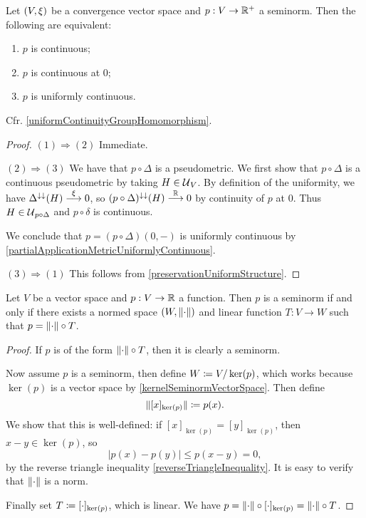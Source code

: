 \begin{proposition} \label{uniformContinuitySeminorms}
Let $\sSet{V,\xi}$ be a convergence vector space and $p: V\to \mathbb{R}^+$ a seminorm. Then the following are equivalent:
\begin{enumerate}
\item $p$ is continuous;
\item $p$ is continuous at $0$;
\item $p$ is uniformly continuous.
\end{enumerate}
\end{proposition}
Cfr. \ref{uniformContinuityGroupHomomorphism}.
\begin{proof}
$(1) \Rightarrow (2)$ Immediate.

$(2) \Rightarrow (3)$ We have that $p\circ \Delta$ is a pseudometric. We first show that $p\circ \Delta$ is a continuous pseudometric by taking $H\in \operatorname{\mathcal{U}}_V$. By definition of the uniformity, we have $\Delta^{\downarrow\downarrow}(H)\overset{\xi}{\longrightarrow} 0$, so $(p\circ \Delta)^{\downarrow\downarrow}(H) \overset{\mathbb{R}}{\longrightarrow} 0$ by continuity of $p$ at $0$. Thus $H\in \operatorname{\mathcal{U}}_{p\circ \Delta}$ and $p\circ \delta$ is continuous.

We conclude that $p = (p\circ \Delta)(0,-)$ is uniformly continuous by \ref{partialApplicationMetricUniformlyContinuous}.

$(3) \Rightarrow (1)$ This follows from \ref{preservationUniformStructure}.
\end{proof}

\begin{proposition} \label{seminormFactorisation}
Let $V$ be a vector space and $p: V\to \mathbb{R}$ a function. Then $p$ is a seminorm \textup{if and only if} there exists a normed space $\sSet{W,\norm{\cdot}}$ and linear function $T: V\to W$ such that $p = \lVert\cdot\rVert\circ T$.
\end{proposition}
\begin{proof}
If $p$ is of the form $\lVert\cdot\rVert\circ T$, then it is clearly a seminorm.

Now assume $p$ is a seminorm, then define $W \coloneqq V/\ker(p)$, which works because $\ker(p)$ is a vector space by \ref{kernelSeminormVectorSpace}. Then define
\[ \lVert[x]_{\ker(p)}\rVert \coloneqq p(x). \]
We show that this is well-defined: if $[x]_{\ker(p)} = [y]_{\ker(p)}$, then $x-y\in \ker(p)$, so 
\[ |p(x) - p(y)| \leq p(x-y) = 0, \]
by the reverse triangle inequality \ref{reverseTriangleInequality}. It is easy to verify that $\lVert\cdot\rVert$ is a norm.

Finally set $T \coloneqq [\cdot]_{\ker(p)}$, which is linear. We have $p = \lVert\cdot\rVert\circ [\cdot]_{\ker(p)} = \lVert\cdot\rVert\circ T$.
\end{proof}

